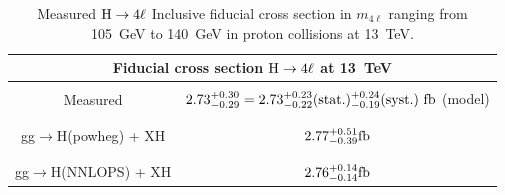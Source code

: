 \begin{table}[!h!tb]
\begin{center}
      \caption{
Measured $\mathrm{H}\rightarrow4\ell$ Inclusive fiducial cross section in $m_{4\ell}$ ranging from 105~GeV to 140~GeV in proton collisions at 13~TeV.
        } \label{tab:incresults}
\begin{tabular}{|c|c|}
\hline %
\hline %
\multicolumn{2}{|c|}{ \textbf{Fiducial cross section $\mathrm{H}\rightarrow4\ell$ at 13~TeV}} \\
\hline %
\vspace{-0.4cm} & \\
Measured & $2.73^{+0.30}_{-0.29}=2.73^{+0.23}_{-0.22}({\rm stat.})^{+0.24}_{-0.19}({\rm syst.})~{\rm fb}$  {\rm (model)} \\
\vspace{-0.4cm} & \\
\hline %
\vspace{-0.4cm} & \\
\small gg$\rightarrow$H({\sc powheg}) + XH & $2.77^{\rm +0.51}_{\rm -0.39}{\rm fb}$ \\
\vspace{-0.4cm} & \\
\hline %
\vspace{-0.4cm} & \\
\small gg$\rightarrow$H({\sc NNLOPS}) + XH & $2.76^{\rm +0.14}_{\rm -0.14}{\rm fb}$ \\  %
\hline %

\end{tabular}
\end{center}
\end{table}

